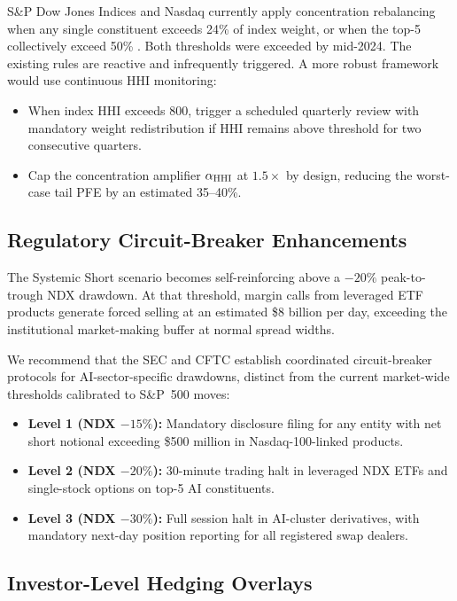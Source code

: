 S\&P Dow Jones Indices and Nasdaq currently apply concentration rebalancing when any
single constituent exceeds 24\% of index weight, or when the top-5 collectively exceed
50\% \citep{sp500methodology,nasdaq100methodology}. Both thresholds were exceeded by
mid-2024. The existing rules are reactive and infrequently triggered. A more robust
framework would use continuous HHI monitoring:

\begin{itemize}
  \item When index HHI exceeds 800, trigger a scheduled quarterly review with mandatory
        weight redistribution if HHI remains above threshold for two consecutive quarters.
  \item Cap the concentration amplifier $\alpha_{\text{HHI}}$ at $1.5\times$ by design,
        reducing the worst-case tail PFE by an estimated 35--40\%.
\end{itemize}

\subsection{Regulatory Circuit-Breaker Enhancements}

The Systemic Short scenario becomes self-reinforcing above a $-20\%$ peak-to-trough
NDX drawdown. At that threshold, margin calls from leveraged ETF products generate
forced selling at an estimated \$8 billion per day, exceeding the institutional
market-making buffer at normal spread widths.

We recommend that the SEC and CFTC establish coordinated circuit-breaker protocols
for AI-sector-specific drawdowns, distinct from the current market-wide thresholds
calibrated to S\&P~500 moves:

\begin{itemize}
  \item \textbf{Level 1 (NDX $-15\%$):} Mandatory disclosure filing for any entity with
        net short notional exceeding \$500 million in Nasdaq-100-linked products.
  \item \textbf{Level 2 (NDX $-20\%$):} 30-minute trading halt in leveraged NDX ETFs
        and single-stock options on top-5 AI constituents.
  \item \textbf{Level 3 (NDX $-30\%$):} Full session halt in AI-cluster derivatives,
        with mandatory next-day position reporting for all registered swap dealers.
\end{itemize}

\subsection{Investor-Level Hedging Overlays}

